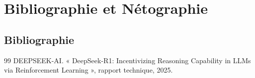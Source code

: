 \documentclass[a4paper,11pt,oneside]{report}
\begin{document}
\chapter*{Bibliographie et Nétographie}

\section*{Bibliographie}
\begin{thebibliography}{99}
 DEEPSEEK-AI. « DeepSeek-R1: Incentivizing Reasoning Capability in LLMs via Reinforcement Learning », rapport technique, 2025.
\end{thebibliography}
\end{document}
